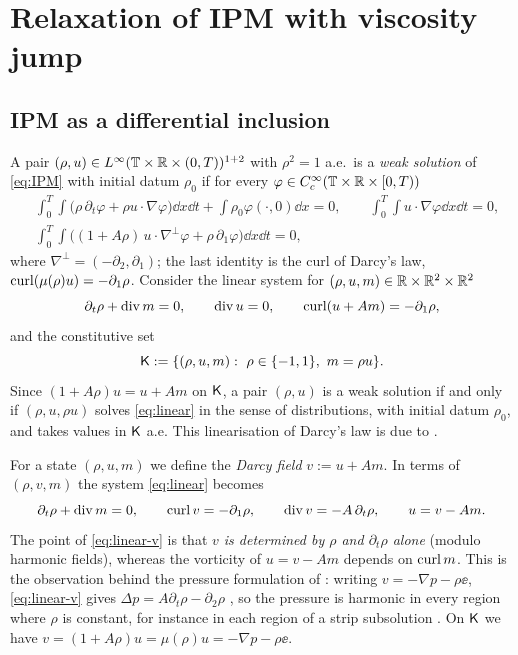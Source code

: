 \section{Relaxation of IPM with viscosity jump}\label{sec:relax}

\subsection{IPM as a differential inclusion}
A pair $(\rho,u)\in L^\infty(\mathbb{T}\times\mathbb{R}\times(0,T))^{1+2}$ with $\rho^2=1$ a.e.\ is a \emph{weak solution} of \eqref{eq:IPM} with initial datum $\rho_0$ if for every
$\varphi\in C^\infty_c(\mathbb{T}\times\mathbb{R}\times[0,T))$
\begin{equation}\label{eq:weak}
\begin{aligned}
&\int_0^T\!\!\int\big(\rho\,\partial_t\varphi+\rho u\cdot\nabla\varphi\big)\dd x\dd t+\int\rho_0\varphi(\cdot,0)\dd x=0,\qquad \int_0^T\!\!\int u\cdot\nabla\varphi\dd x\dd t=0,\\
&\int_0^T\!\!\int\big((1+A\rho)\,u\cdot\nabla^\perp\varphi+\rho\,\partial_1\varphi\big)\dd x\dd t=0,
\end{aligned}
\end{equation}
where $\nabla^\perp=(-\partial_2,\partial_1)$; the last identity is the curl of Darcy's law, $\operatorname{curl}(\mu(\rho)u)=-\partial_1\rho$.
Consider the linear system for $(\rho,u,m)\in\mathbb{R}\times\mathbb{R}^2\times\mathbb{R}^2$
\begin{equation}\label{eq:linear}
\partial_t\rho+\operatorname{div} m=0,\qquad \operatorname{div} u=0,\qquad \operatorname{curl}(u+Am)=-\partial_1\rho,
\end{equation}
and the constitutive set
\[
\mathsf{K}:=\{(\rho,u,m):\ \rho\in\{-1,1\},\ m=\rho u\}.
\]
Since $(1+A\rho)u=u+Am$ on $\mathsf{K}$, a pair $(\rho,u)$ is a weak solution if and only if $(\rho,u,\rho u)$ solves \eqref{eq:linear} in the sense of distributions, with initial datum $\rho_0$,
and takes values in $\mathsf{K}$ a.e. This linearisation of Darcy's law is due to \cite{Men22}.

For a state $(\rho,u,m)$ we define the \emph{Darcy field} $v:=u+Am$. In terms of $(\rho,v,m)$ the system \eqref{eq:linear} becomes
\begin{equation}\label{eq:linear-v}
\partial_t\rho+\operatorname{div} m=0,\qquad \operatorname{curl} v=-\partial_1\rho,\qquad \operatorname{div} v=-A\,\partial_t\rho,\qquad u=v-Am .
\end{equation}
The point of \eqref{eq:linear-v} is that \emph{$v$ is determined by $\rho$ and $\partial_t\rho$ alone} (modulo harmonic fields), whereas the vorticity of $u=v-Am$ depends on $\operatorname{curl} m$.
This is the observation behind the pressure formulation of \cite{LM26}: writing $v=-\nabla p-\rho\ee$, \eqref{eq:linear-v} gives $\Delta p=A\partial_t\rho-\partial_2\rho$
\cite[Sec.~3.1.5]{LM26}, so the pressure is harmonic in every region where $\rho$ is constant, for instance in each region of a strip subsolution \cite[Secs.~3.3.2 and~3.3.5]{LM26}.
On $\mathsf{K}$ we have $v=(1+A\rho)u=\mu(\rho)u=-\nabla p-\rho\ee$.

